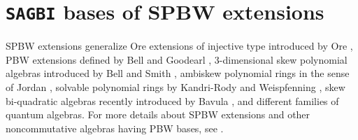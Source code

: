 \documentclass{amsart}
\theoremstyle{definition}
\theoremstyle{remark}
\numberwithin{equation}{section}
\begin{document}
\section{\texttt{SAGBI} bases of SPBW extensions}\label{SAGBIbasesSPBW}

SPBW extensions generalize Ore extensions of injective type introduced by Ore \cite{Ore1933}, PBW extensions defined by Bell and Goodearl \cite{BellGoodearl1988}, 3-dimensional skew polynomial algebras introduced by Bell and Smith \cite{BellSmith1990}, ambiskew polynomial rings in the sense of Jordan \cite{Jordan1990}, solvable polynomial rings by Kandri-Rody and Weispfenning \cite{KandriRodyWeispfenning1990}, skew bi-quadratic algebras recently introduced by Bavula \cite{Bavula2023}, and different families of quantum algebras. For more details about SPBW extensions and other noncommutative algebras having PBW bases, see \cite{BuesoTorrecillasVerschoren, GoodearlWarfield2004, GomezTorrecillas2014, Levandovskyy2005, Li2002, Reyes2014, ReyesSuarezMomento2017, ReyesSuarez20173dimentional, Seiler2010}. 
\end{document}
